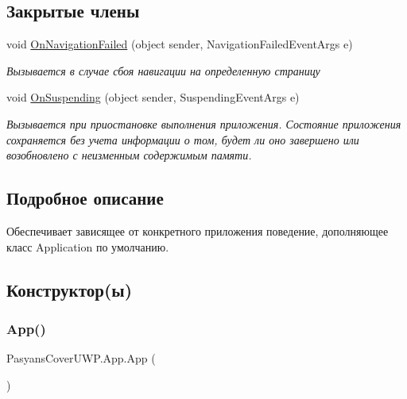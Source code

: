 \subsection*{Закрытые члены}
\begin{DoxyCompactItemize}
\item 
void \hyperlink{class_pasyans_cover_u_w_p_1_1_app_afb3b9941368b3471b0963cca63d3aad9}{On\+Navigation\+Failed} (object sender, Navigation\+Failed\+Event\+Args e)
\begin{DoxyCompactList}\small\item\em Вызывается в случае сбоя навигации на определенную страницу \end{DoxyCompactList}\item 
void \hyperlink{class_pasyans_cover_u_w_p_1_1_app_ac6a96abb073dd70340b917f4e7ef9762}{On\+Suspending} (object sender, Suspending\+Event\+Args e)
\begin{DoxyCompactList}\small\item\em Вызывается при приостановке выполнения приложения. Состояние приложения сохраняется без учета информации о том, будет ли оно завершено или возобновлено с неизменным содержимым памяти. \end{DoxyCompactList}\end{DoxyCompactItemize}


\subsection{Подробное описание}
Обеспечивает зависящее от конкретного приложения поведение, дополняющее класс Application по умолчанию. 



\subsection{Конструктор(ы)}
\mbox{\label{class_pasyans_cover_u_w_p_1_1_app_afd24d3b5e2849dcc9fdc1d27108b740e}} 
\subsubsection{\texorpdfstring{App()}{App()}}
{\footnotesize\ttfamily Pasyans\+Cover\+U\+W\+P.\+App.\+App (\begin{DoxyParamCaption}{ }\end{DoxyParamCaption})\hspace{0.3cm}{\ttfamily [inline]}}




